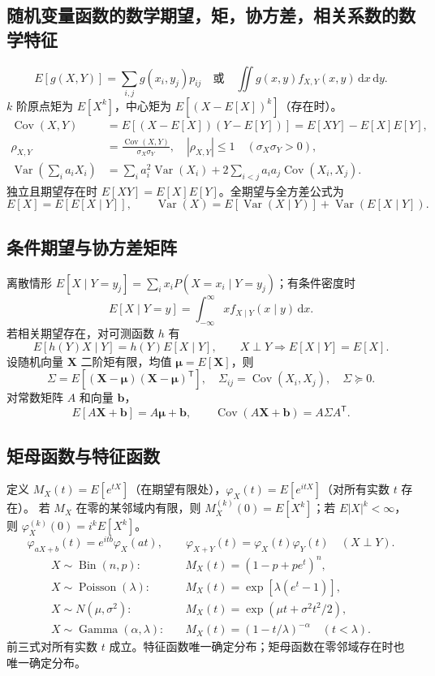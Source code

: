 \documentclass[../main.tex]{subfiles}
\begin{document}
\subsection{随机变量函数的数学期望，矩，协方差，相关系数的数学特征}
\[
E[g(X,Y)]=\sum_{i,j}g(x_i,y_j)p_{ij}
\quad\text{或}\quad\iint g(x,y)f_{X,Y}(x,y)\,\mathrm dx\,\mathrm dy.
\]
$k$ 阶原点矩为 $E[X^k]$，中心矩为 $E[(X-E[X])^k]$（存在时）。
\begin{align*}
\operatorname{Cov}(X,Y)&=E[(X-E[X])(Y-E[Y])]=E[XY]-E[X]E[Y],\\
\rho_{X,Y}&=\frac{\operatorname{Cov}(X,Y)}{\sigma_X\sigma_Y},\quad |\rho_{X,Y}|\le1\quad(\sigma_X\sigma_Y>0),\\
\operatorname{Var}\left(\sum_i a_iX_i\right)&=\sum_i a_i^2\operatorname{Var}(X_i)
+2\sum_{i<j}a_ia_j\operatorname{Cov}(X_i,X_j).
\end{align*}
独立且期望存在时 $E[XY]=E[X]E[Y]$。全期望与全方差公式为
\[
E[X]=E[E[X\mid Y]],\qquad
\operatorname{Var}(X)=E[\operatorname{Var}(X\mid Y)]+\operatorname{Var}(E[X\mid Y]).
\]
\subsection{条件期望与协方差矩阵}
离散情形 $E[X\mid Y=y_j]=\sum_i x_iP(X=x_i\mid Y=y_j)$；有条件密度时
\[
E[X\mid Y=y]=\int_{-\infty}^{\infty}xf_{X\mid Y}(x\mid y)\,\mathrm dx.
\]
若相关期望存在，对可测函数 $h$ 有
\[
E[h(Y)X\mid Y]=h(Y)E[X\mid Y],\qquad
X\perp Y\Longrightarrow E[X\mid Y]=E[X].
\]
设随机向量 $\bm X$ 二阶矩有限，均值 $\bm\mu=E[\bm X]$，则
\[
\Sigma=E[(\bm X-\bm\mu)(\bm X-\bm\mu)^{\mathsf T}],\quad
\Sigma_{ij}=\operatorname{Cov}(X_i,X_j),\quad \Sigma\succeq0.
\]
对常数矩阵 $A$ 和向量 $\bm b$，
\[
E[A\bm X+\bm b]=A\bm\mu+\bm b,\qquad
\operatorname{Cov}(A\bm X+\bm b)=A\Sigma A^{\mathsf T}.
\]
\subsection{矩母函数与特征函数}
定义 $M_X(t)=E[e^{tX}]$（在期望有限处），$\varphi_X(t)=E[e^{itX}]$（对所有实数 $t$ 存在）。
若 $M_X$ 在零的某邻域内有限，则 $M_X^{(k)}(0)=E[X^k]$；若 $E|X|^k<\infty$，则 $\varphi_X^{(k)}(0)=i^kE[X^k]$。
\[
\varphi_{aX+b}(t)=e^{itb}\varphi_X(at),\qquad
\varphi_{X+Y}(t)=\varphi_X(t)\varphi_Y(t)\quad(X\perp Y).
\]
\begin{align*}
X\sim\operatorname{Bin}(n,p):&\quad M_X(t)=(1-p+pe^t)^n,\\
X\sim\operatorname{Poisson}(\lambda):&\quad M_X(t)=\exp[\lambda(e^t-1)],\\
X\sim N(\mu,\sigma^2):&\quad M_X(t)=\exp(\mu t+\sigma^2t^2/2),\\
X\sim\operatorname{Gamma}(\alpha,\lambda):&\quad M_X(t)=(1-t/\lambda)^{-\alpha}\quad(t<\lambda).
\end{align*}
前三式对所有实数 $t$ 成立。特征函数唯一确定分布；矩母函数在零邻域存在时也唯一确定分布。
\end{document}
